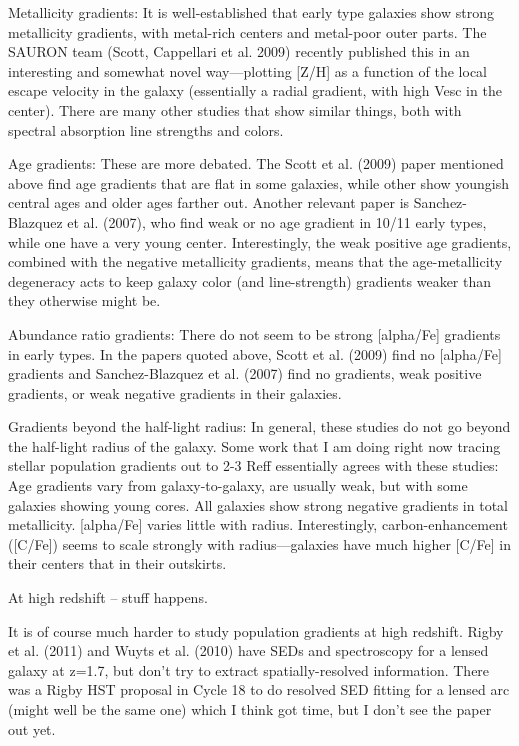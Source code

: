 \message{ !name(clashresolved.tex)}\documentclass{emulateapj}
\begin{document}
\citep{Somerville:2003aa}\citep{Ferguson:2004qw}

\citep{Moustakas:1998tn}

Metallicity gradients: It is well-established that early type galaxies
show strong metallicity gradients, with metal-rich centers and
metal-poor outer parts.  The SAURON team (Scott, Cappellari et
al. 2009) recently published this in an interesting and somewhat novel
way---plotting [Z/H] as a function of the local escape velocity in the
galaxy (essentially a radial gradient, with high Vesc in the center).
There are many other studies that show similar things, both with
spectral absorption line strengths and colors.

Age gradients: These are more debated.  The Scott et al. (2009) paper
mentioned above find age gradients that are flat in some galaxies,
while other show youngish central ages and older ages farther out.
Another relevant paper is Sanchez-Blazquez et al. (2007), who find
weak or no age gradient in 10/11 early types, while one have a very
young center.  Interestingly, the weak positive age gradients,
combined with the negative metallicity gradients, means that the
age-metallicity degeneracy acts to keep galaxy color (and
line-strength) gradients weaker than they otherwise might be.

Abundance ratio gradients: There do not seem to be strong [alpha/Fe]
gradients in early types.  In the papers quoted above, Scott et
al. (2009) find no [alpha/Fe] gradients and Sanchez-Blazquez et
al. (2007) find no gradients, weak positive gradients, or weak
negative gradients in their galaxies.

Gradients beyond the half-light radius: In general, these studies do
not go beyond the half-light radius of the galaxy.  Some work that I
am doing right now tracing stellar population gradients out to 2-3
Reff essentially agrees with these studies: Age gradients vary from
galaxy-to-galaxy, are usually weak, but with some galaxies showing
young cores.  All galaxies show strong negative gradients in total
metallicity.  [alpha/Fe] varies little with radius.  Interestingly,
carbon-enhancement ([C/Fe]) seems to scale strongly with
radius---galaxies have much higher [C/Fe] in their centers that in
their outskirts.

At high redshift -- stuff happens. 

It is of course much harder to study population gradients at high
redshift.  Rigby et al. (2011) and Wuyts et al. (2010) have SEDs and
spectroscopy for a lensed galaxy at z=1.7, but don't try to extract
spatially-resolved information.  There was a Rigby HST proposal in
Cycle 18 to do resolved SED fitting for a lensed arc (might well be
the same one) which I think got time, but I don't see the paper out
yet.
\end{document}
